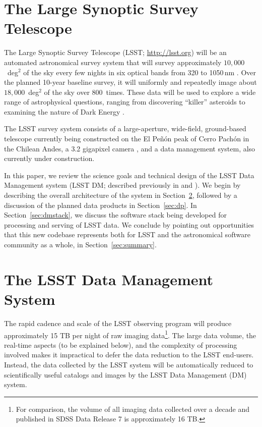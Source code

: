 \documentclass[11pt,twoside]{article}
\begin{document}
\section{ The Large Synoptic Survey Telescope }

The Large Synoptic Survey Telescope (LSST; \url{http://lsst.org}) will be an
automated astronomical survey system that will survey approximately
$10,000$~deg$^2$ of the sky every few nights in six optical bands from 320
to 1050\,nm \citep{2008arXiv0805.2366I}. Over the planned 10-year baseline
survey, it will uniformly and repeatedly image about $18,000$~deg$^2$ of the sky
over $800$~times. These data will be used to explore
a wide range of astrophysical questions, ranging from discovering
``killer'' asteroids to examining the nature of Dark Energy
\citep[e.g., see][]{2009arXiv0912.0201L}.

The LSST survey system consists of a large-aperture, wide-field, ground-based telescope \citep{2014SPIE.9145E..1AG}
currently being constructed on the El Pe\~n\'{o}n peak of Cerro Pach\'{o}n in the Chilean
Andes, a 3.2 gigapixel camera \citep{2010SPIE.7735E..0JK}, and a data management
system, also currently under construction.

In this paper, we review the science goals and technical design of the
LSST Data Management system
(LSST DM; described previously in \citet{2007ASPC..376....3K} and \citet{2010SPIE.7740E..1NK}).
We begin by describing the overall architecture of the system in
Section~\ref{sec:dm}, followed by a discussion of the planned data
products in Section~\ref{sec:dp}. In Section~\ref{sec:dmstack}, we
discuss the software stack being developed for processing and serving
of LSST data. We  conclude by pointing out opportunities that this new codebase
represents both for LSST and the astronomical software community as
a whole, in Section~\ref{sec:summary}.

\section{ The LSST Data Management System }
\label{sec:dm}

The rapid cadence and scale of the LSST observing program will produce
approximately 15 TB per night of raw imaging data\footnote{For
  comparison, the volume of all imaging data collected over a decade
  and published in SDSS Data Release 7 \citep{2009ApJS..182..543A} is approximately 16 TB.}. The large data volume, the real-time aspects
(to be explained below), and the complexity of processing involved makes it impractical to defer the data reduction to the LSST end-users. Instead, the data collected by the LSST system will be automatically reduced to scientifically useful catalogs and images by the LSST Data Management (DM) system.
\\
\end{document}
